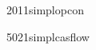 \documentclass[
12pt,
a4paper,
final,
notitlepage,
oneside,
openany,
]{report}
\begin{document}
{2011simplopcon}

{5021simplcasflow}
\end{document}
